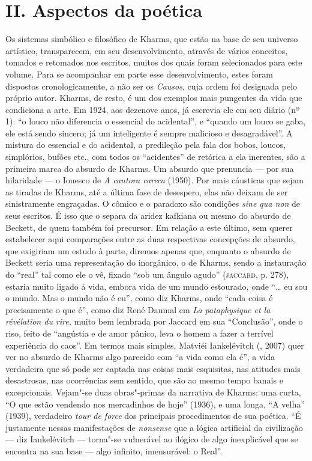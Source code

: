\section{II. Aspectos da poética}

Os sistemas simbólico e filosófico de Kharms, que estão na base de seu
universo artístico, transparecem, em seu desenvolvimento, através de
vários conceitos, tomados e retomados nos escritos, muitos dos quais
foram selecionados para este volume. Para se acompanhar em parte esse
desenvolvimento, estes foram dispostos cronologicamente, a não ser os
\emph{Causos}, cuja ordem foi designada pelo próprio autor. Kharms, de
resto, é um dos exemplos mais pungentes da vida que condiciona a arte.
Em 1924, aos dezenove anos, já escrevia ele em seu diário (nº 1): ``o
louco não diferencia o essencial do acidental'', e ``quando um louco se
gaba, ele está sendo sincero; já um inteligente é sempre malicioso e
desagradável''. A mistura do essencial e do acidental, a predileção pela
fala dos bobos, loucos, simplórios, bufões etc., com todos os
``acidentes'' de retórica a ela inerentes, são a primeira marca do
absurdo de Kharms. Um absurdo que prenuncia --- por sua hilaridade --- o
Ionesco de \emph{A cantora careca} (1950). Por mais cáusticas que sejam
as tiradas de Kharms, até a última fase de desespero, elas não deixam de
ser sinistramente engraçadas. O cômico e o paradoxo são condições
\emph{sine qua non} de seus escritos. É isso que o separa da aridez
kafkiana ou mesmo do absurdo de Beckett, de quem também foi precursor.
Em relação a este último, sem querer estabelecer aqui comparações entre
as duas respectivas concepções de absurdo, que exigiriam um estudo à
parte, diremos apenas que, enquanto o absurdo de Beckett seria uma
representação do inorgânico, o de Kharms, sendo a instauração do
``real'' tal como ele o vê, fixado ``sob um ângulo agudo''
(\textsc{jaccard}, p. 278), estaria muito ligado à vida, embora vida de
um mundo estourado, onde ``\ldots{} eu sou o mundo. Mas o mundo não é eu'',
como diz Kharms, onde ``cada coisa é precisamente o que é'', como diz
René Daumal em \emph{La pataphysique et la révélation du rire,} muito
bem lembrada por Jaccard em sua ``Conclusão'', onde o riso, feito de
``angústia e de amor pânico, leva o homem a fazer a terrível experiência
do caos''. Em termos mais simples, Matviéi Iankelévitch (,
2007) quer ver no absurdo de Kharms algo parecido com ``a vida como ela
é'', a vida verdadeira que só pode ser captada nas coisas mais
esquisitas, nas atitudes mais desastrosas, nas ocorrências sem sentido,
que são ao mesmo tempo banais e excepcionais. Vejam"-se duas obras"-primas
da narrativa de Kharms: uma curta, ``O que estão vendendo
nos mercadinhos de hoje'' (1936), e uma longa, ``A velha'' (1939),
verdadeiro \emph{tour de force} dos principais procedimentos de sua
poética. ``É justamente nessas manifestações de \emph{nonsense} que a
lógica artificial da civilização --- diz Iankelévitch --- torna"-se
vulnerável ao ilógico de algo inexplicável que se encontra na sua base
--- algo infinito, imensurável: o Real''.


